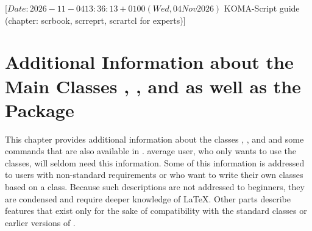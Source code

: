 %
%
%
%
%
%
%

                 [$Date: 2026-11-04 13:36:13 +0100 (Wed, 04 Nov 2026) $
                  KOMA-Script guide (chapter: scrbook, scrreprt, scrartcl for
                                     experts)]


\chapter[{Additional Information about the Main Classes and
  \Package{scrextend}}]{Additional Information about the Main Classes
  ,
  , and  as well as the Package
  }

\BeginIndexGroup%
%
%
%
%
This chapter provides additional information about the \KOMAScript{} classes
, , and  and some commands that
are also available in .  average user, who only wants to
use the classes, will seldom need this information. Some of this information
is addressed to users with non-standard requirements or who want to write
their own classes based on a \KOMAScript{} class. Because such descriptions
are not addressed to beginners, they are condensed and require deeper
knowledge of \LaTeX. Other parts describe features that exist only for the
sake of compatibility with the standard classes or earlier versions of
\KOMAScript{}.

